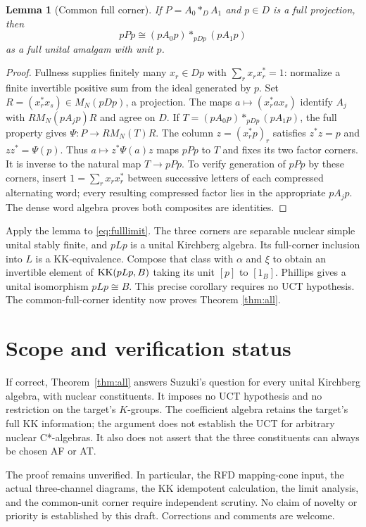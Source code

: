 \documentclass[11pt]{article}
\newtheorem{lemma}[theorem]{Lemma}
\theoremstyle{remark}\newtheorem{remark}[theorem]{Remark}
\begin{document}
\begin{lemma}[Common full corner]\label{lem:corner}
If $P=A_0*_D A_1$ and $p\in D$ is a full projection, then
\[
                    pPp\cong(pA_0p)*_{pDp}(pA_1p)
\]
as a full unital amalgam with unit $p$.
\end{lemma}
\begin{proof}
Fullness supplies finitely many $x_r\in Dp$ with
$\sum_rx_rx_r^*=1$: normalize a finite invertible positive sum from the
ideal generated by $p$. Set $R=(x_r^*x_s)\in M_N(pDp)$, a projection.
The maps $a\mapsto(x_r^*ax_s)$ identify $A_j$ with
$RM_N(pA_jp)R$ and agree on $D$. If $T=(pA_0p)*_{pDp}(pA_1p)$,
the full property gives $\Psi:P\to RM_N(T)R$. The column
$z=(x_r^*p)_r$ satisfies $z^*z=p$ and $zz^*=\Psi(p)$.
Thus $a\mapsto z^*\Psi(a)z$ maps $pPp$ to $T$ and fixes its two factor
corners. It is inverse to the natural map $T\to pPp$. To verify
generation of $pPp$ by these corners, insert
$1=\sum_rx_rx_r^*$ between successive letters of each compressed
alternating word; every resulting compressed factor lies in the
appropriate $pA_jp$. The dense word algebra proves both composites are
identities.
\end{proof}

Apply the lemma to \eqref{eq:fulllimit}. The three corners are separable
nuclear simple unital stably finite, and $pLp$ is a unital Kirchberg
algebra. Its full-corner inclusion into $L$ is a KK-equivalence. Compose
that class with $\alpha$ and $\xi$ to obtain an invertible element of
$\operatorname{KK}(pLp,B)$ taking its unit $[p]$ to $[1_B]$.
Phillips \cite[Corollary 4.2.2]{Phillips} gives a unital isomorphism
$pLp\cong B$. This precise corollary requires no UCT hypothesis.
The common-full-corner identity now proves Theorem \ref{thm:all}.

\section{Scope and verification status}
If correct, Theorem~\ref{thm:all} answers Suzuki's question for every
unital Kirchberg algebra, with nuclear constituents. It imposes no UCT
hypothesis and no restriction on the target's $K$-groups. The coefficient
algebra retains the target's full KK information; the argument does not
establish the UCT for arbitrary nuclear C*-algebras. It also does not
assert that the three constituents can always be chosen AF or AT.

The proof remains unverified. In particular, the RFD mapping-cone input,
the actual three-channel diagrams, the KK idempotent calculation, the
limit analysis, and the common-unit corner require independent scrutiny.
No claim of novelty or priority is established by this draft. Corrections
and comments are welcome.
\end{document}
